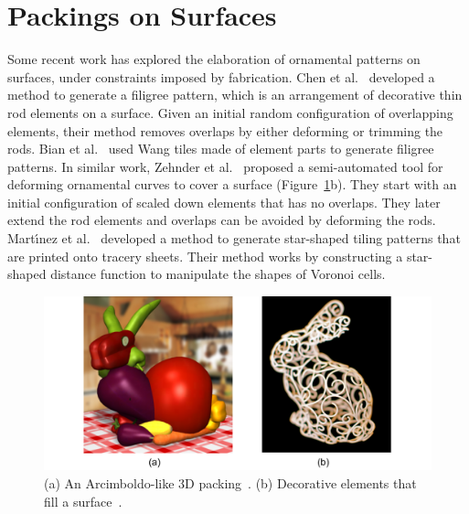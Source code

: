 \section{Packings on Surfaces}



\newtext
{
Some recent work has explored the elaboration of ornamental
patterns on surfaces, under constraints imposed by fabrication.  
Chen et al.~\cite{Chen2016} developed a method to generate a filigree pattern,
which is an arrangement of decorative thin rod elements on a surface.
Given an initial random configuration of overlapping elements, their method
removes overlaps by either deforming or trimming the rods.
Bian et al.~\cite{Bian2018} used Wang tiles made of element parts to generate filigree patterns.
In similar work, Zehnder et al.~\cite{Zehnder2016} 
proposed a semi-automated tool for deforming ornamental curves to cover a surface (Figure~\ref{fig_related_gal_zehnder}b). 
They start with an initial configuration of scaled down elements
that has no overlaps. They later extend the rod elements and 
overlaps can be avoided by deforming the rods.
Mart\'{\i}nez et al.~\cite{Martinez2019} developed a method to generate
star-shaped tiling patterns that are printed onto tracery sheets.
Their method works by constructing a star-shaped distance function to manipulate the shapes of Voronoi cells. 
}

\begin{figure}[h]
\bigskip
\bigskip
\bigskip
\centering
\includegraphics[width=1.0\textwidth]{figures/related/gal_zehnder.pdf} 
\caption[A 3D packing and a packing on a surface]
{\label{fig_related_gal_zehnder} 
\newtext
{
(a) An Arcimboldo-like 3D packing~\cite{Gal2007B}. 
(b) Decorative elements that fill a surface~\cite{Zehnder2016}.
}
}
\end{figure}

